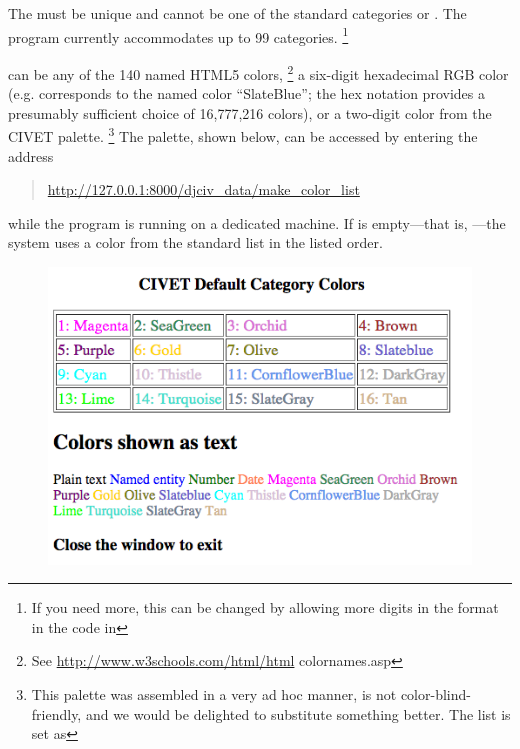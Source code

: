 \documentclass[letterpaper,10pt,english]{sphinxmanual}
\begin{document}
The  must be unique and cannot be one of the standard
categories  or . The program currently
accommodates up to 99 categories. \footnote{
If you need more, this can be changed by allowing more digits in
the  format in the code
in 
}

\begin{DUlineblock}{0em}
\item[]  can be any of the 140 named HTML5 colors, \footnote{
See \href{http://www.w3schools.com/html/html}{http://www.w3schools.com/html/html} colornames.asp
} a six-digit
hexadecimal RGB color (e.g.  corresponds to the named color
“SlateBlue”; the hex notation provides a presumably sufficient choice
of 16,777,216 colors), or a two-digit color from the CIVET
palette. \footnote{
This palette was assembled in a very ad hoc manner, is not
color-blind-friendly, and we would be delighted to substitute
something better. The list is set as 
} The palette, shown below, can be
accessed by entering the address
\end{DUlineblock}
\begin{quote}

\href{http://127.0.0.1:8000/djciv\_data/make\_color\_list}{http://127.0.0.1:8000/djciv\_data/make\_color\_list}
\end{quote}

\begin{DUlineblock}{0em}
\item[] while the program is running on a dedicated machine. If \code{{[}color{]}} is
empty—that is, \code{{[}{]}}—the system uses a color from the standard list
in the listed order.
\end{DUlineblock}
\begin{figure}[htbp]
\centering

\includegraphics{defaultcolors.png}
\end{figure}
\end{document}
